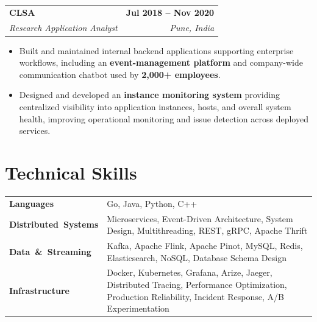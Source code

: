 \documentclass[10pt,a4paper]{article}
\makeatletter
\newcommand{\company}[4]{%
    \begin{tabularx}{\textwidth}{@{}Xr@{}}
        {\large\textbf{#1}} &
        {\small\textbf{#3}} \\[2pt]

        {\textit{\color{secondary}#2}} &
        {\small\textit{\color{secondary}#4}}
    \end{tabularx}
    \vspace{5pt}
}
\newcommand{\skillrow}[2]{%
    \textbf{#1} & #2 \\
}
\makeatother
\begin{document}

\company
{CLSA}
{Research Application Analyst}
{Jul 2018 -- Nov 2020}
{Pune, India}

\begin{itemize}

    \item
    Built and maintained internal backend applications supporting
    enterprise workflows, including an \textbf{event-management platform}
    and company-wide communication chatbot used by
    \textbf{2,000+ employees}.

    \item
    Designed and developed an \textbf{instance monitoring system} providing
    centralized visibility into application instances, hosts, and overall
    system health, improving operational monitoring and issue detection
    across deployed services.

\end{itemize}


\section{Technical Skills}

\renewcommand{\arraystretch}{1.35}

\begin{tabularx}{\textwidth}{@{}p{3.8cm}X@{}}

\skillrow
{\mbox{Languages}}
{Go, Java, Python, C++}

\skillrow
{\mbox{Distributed Systems}}
{Microservices, Event-Driven Architecture, System Design,
Multithreading, REST, gRPC, Apache Thrift}

\skillrow
{\mbox{Data \& Streaming}}
{Kafka, Apache Flink, Apache Pinot, MySQL, Redis,
Elasticsearch, NoSQL, Database Schema Design}


\skillrow
{\mbox{Infrastructure}}
{Docker, Kubernetes, Grafana, Arize, Jaeger, Distributed Tracing,
Performance Optimization, Production Reliability, Incident Response,
A/B Experimentation}


\end{tabularx}

\end{document}
